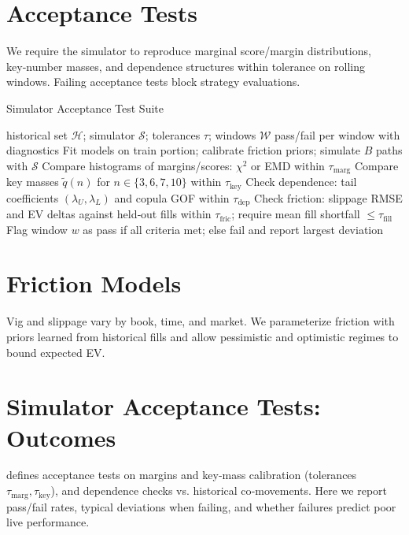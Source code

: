 \section{Acceptance Tests}
We require the simulator to reproduce marginal score/margin distributions, key‑number masses, and dependence structures within tolerance on rolling windows. Failing acceptance tests block strategy evaluations.

\begin{algorithm}[t]
  \caption{Simulator Acceptance Test Suite}
  \label{alg:sim-accept}
  \begin{algorithmic}[1]
    \Require historical set $\mathcal H$; simulator $\mathcal S$; tolerances $\tau$; windows $\mathcal W$
    \Ensure pass/fail per window with diagnostics
      \State Fit models on train portion; calibrate friction priors; simulate $B$ paths with $\mathcal S$
      \State Compare histograms of margins/scores: $\chi^2$ or EMD within $\tau_{\text{marg}}$
      \State Compare key masses $\tilde q(n)$ for $n\in\{3,6,7,10\}$ within $\tau_{\text{key}}$
      \State Check dependence: tail coefficients $(\lambda_U,\lambda_L)$ and copula GOF within $\tau_{\text{dep}}$
      \State Check friction: slippage RMSE and EV deltas against held‑out fills within $\tau_{\text{fric}}$; require mean fill shortfall $\le \tau_{\text{fill}}$
      \State Flag window $w$ as pass if all criteria met; else fail and report largest deviation
    \EndFor
  \end{algorithmic}
\end{algorithm}

\section{Friction Models}
Vig and slippage vary by book, time, and market. We parameterize friction with priors learned from historical fills and allow pessimistic and optimistic regimes to bound expected EV.


\section{Simulator Acceptance Tests: Outcomes}\label{sec:sim-acceptance-outcomes}
 defines acceptance tests on margins and key‑mass calibration (tolerances $\tau_{\mathrm{marg}},\tau_{\mathrm{key}}$), and dependence checks vs. historical co‑movements. Here we report pass/fail rates, typical deviations when failing, and whether failures predict poor live performance.

